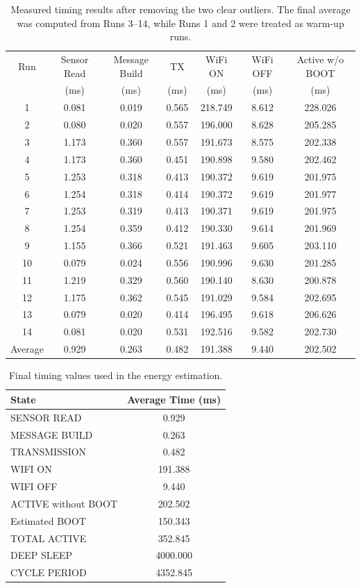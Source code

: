 \documentclass{article}
\begin{document}
\begin{table}[H]
\centering
\small
\begin{tabular}{c c c c c c c}
\hline
Run & Sensor Read & Message Build & TX & WiFi ON & WiFi OFF & Active w/o BOOT \\
 & (ms) & (ms) & (ms) & (ms) & (ms) & (ms) \\
\hline
1  & 0.081 & 0.019 & 0.565 & 218.749 & 8.612 & 228.026 \\
2  & 0.080 & 0.020 & 0.557 & 196.000 & 8.628 & 205.285 \\
3  & 1.173 & 0.360 & 0.557 & 191.673 & 8.575 & 202.338 \\
4  & 1.173 & 0.360 & 0.451 & 190.898 & 9.580 & 202.462 \\
5  & 1.253 & 0.318 & 0.413 & 190.372 & 9.619 & 201.975 \\
6  & 1.254 & 0.318 & 0.414 & 190.372 & 9.619 & 201.977 \\
7  & 1.253 & 0.319 & 0.413 & 190.371 & 9.619 & 201.975 \\
8  & 1.254 & 0.359 & 0.412 & 190.330 & 9.614 & 201.969 \\
9  & 1.155 & 0.366 & 0.521 & 191.463 & 9.605 & 203.110 \\
10 & 0.079 & 0.024 & 0.556 & 190.996 & 9.630 & 201.285 \\
11 & 1.219 & 0.329 & 0.560 & 190.140 & 8.630 & 200.878 \\
12 & 1.175 & 0.362 & 0.545 & 191.029 & 9.584 & 202.695 \\
13 & 0.079 & 0.020 & 0.414 & 196.495 & 9.618 & 206.626 \\
14 & 0.081 & 0.020 & 0.531 & 192.516 & 9.582 & 202.730 \\
\hline
Average & 0.929 & 0.263 & 0.482 & 191.388 & 9.440 & 202.502 \\
\hline
\end{tabular}
\caption{Measured timing results after removing the two clear outliers. The final average was computed from Runs 3--14, while Runs 1 and 2 were treated as warm-up runs.}
\label{tab:timing_stable}
\end{table}

\begin{table}[H]
\centering
\begin{tabular}{l c}
\hline
State & Average Time (ms) \\
\hline
SENSOR READ & 0.929 \\
MESSAGE BUILD & 0.263 \\
TRANSMISSION & 0.482 \\
WIFI ON & 191.388 \\
WIFI OFF & 9.440 \\
\hline
ACTIVE without BOOT & 202.502 \\
Estimated BOOT & 150.343 \\
\hline
TOTAL ACTIVE & 352.845 \\
DEEP SLEEP & 4000.000 \\
CYCLE PERIOD & 4352.845 \\
\hline
\end{tabular}
\caption{Final timing values used in the energy estimation.}
\label{tab:final_timing_values}
\end{table}
\end{document}
